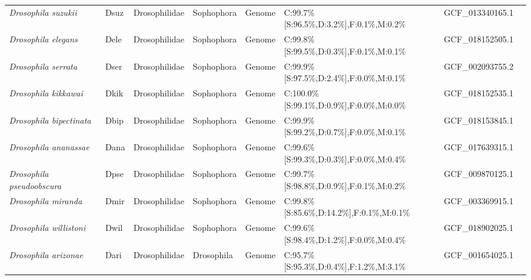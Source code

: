 \documentclass[../main.tex]{subfiles}
\begin{document}
\begin{landscape}
\begin{longtable}{llllllll}
		\textit{Drosophila suzukii}       & Dsuz        & Drosophilidae   & Sophophora        & Genome        & C:99.7\%{[}S:96.5\%,D:3.2\%{]},F:0.1\%,M:0.2\%  & GCF\_013340165.1       & \textbf{\cite{paris2020near}}            \\
		\textit{Drosophila elegans}       & Dele        & Drosophilidae   & Sophophora        & Genome        & C:99.8\%{[}S:99.5\%,D:0.3\%{]},F:0.1\%,M:0.1\%  & GCF\_018152505.1       & \textbf{\cite{kim2021highly}}            \\
		\textit{Drosophila serrata}       & Dser        & Drosophilidae   & Sophophora        & Genome        & C:99.9\%{[}S:97.5\%,D:2.4\%{]},F:0.0\%,M:0.1\%  & GCF\_002093755.2       & \textbf{\cite{allen2017single}}          \\
		\textit{Drosophila kikkawai}      & Dkik        & Drosophilidae   & Sophophora        & Genome        & C:100.0\%{[}S:99.1\%,D:0.9\%{]},F:0.0\%,M:0.0\% & GCF\_018152535.1       & \textbf{\cite{kim2021highly}}            \\
		\textit{Drosophila bipectinata}   & Dbip        & Drosophilidae   & Sophophora        & Genome        & C:99.9\%{[}S:99.2\%,D:0.7\%{]},F:0.0\%,M:0.1\%  & GCF\_018153845.1       & \textbf{\cite{kim2021highly}}            \\
		\textit{Drosophila ananassae}     & Dana        & Drosophilidae   & Sophophora        & Genome        & C:99.6\%{[}S:99.3\%,D:0.3\%{]},F:0.0\%,M:0.4\%  & GCF\_017639315.1       & \textbf{\cite{tvedte2021comparison}}     \\
		\textit{Drosophila pseudoobscura} & Dpse        & Drosophilidae   & Sophophora        & Genome        & C:99.7\%{[}S:98.8\%,D:0.9\%{]},F:0.1\%,M:0.2\%  & GCF\_009870125.1       & \textbf{\cite{liao2021topologically}}    \\
		\textit{Drosophila miranda}       & Dmir        & Drosophilidae   & Sophophora        & Genome        & C:99.8\%{[}S:85.6\%,D:14.2\%{]},F:0.1\%,M:0.1\% & GCF\_003369915.1       & \textbf{\cite{mahajan2018novo}}          \\
		\textit{Drosophila willistoni}    & Dwil        & Drosophilidae   & Sophophora        & Genome        & C:99.6\%{[}S:98.4\%,D:1.2\%{]},F:0.0\%,M:0.4\%  & GCF\_018902025.1       & \textbf{\cite{ranz2023gene}}             \\
		\textit{Drosophila arizonae}      & Dari        & Drosophilidae   & Drosophila        & Genome        & C:95.7\%{[}S:95.3\%,D:0.4\%{]},F:1.2\%,M:3.1\%  & GCF\_001654025.1       & \textbf{\cite{sanchez2016genome}}        \\

\end{longtable}
\end{landscape}
\end{document}
